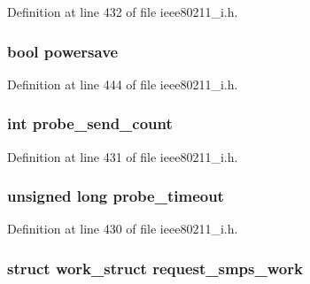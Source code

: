 Definition at line 432 of file ieee80211\-\_\-i.\-h.

\hypertarget{structieee80211__if__managed_afbc3e052896051a278a5ad17f6a6e2bb}{
\subsubsection[{powersave}]{\setlength{\rightskip}{0pt plus 5cm}bool powersave}}\label{structieee80211__if__managed_afbc3e052896051a278a5ad17f6a6e2bb}


Definition at line 444 of file ieee80211\-\_\-i.\-h.

\hypertarget{structieee80211__if__managed_aa9ccec90b375e5c56cc2d521d50e1f3c}{
\subsubsection[{probe\-\_\-send\-\_\-count}]{\setlength{\rightskip}{0pt plus 5cm}int probe\-\_\-send\-\_\-count}}\label{structieee80211__if__managed_aa9ccec90b375e5c56cc2d521d50e1f3c}


Definition at line 431 of file ieee80211\-\_\-i.\-h.

\hypertarget{structieee80211__if__managed_ae94fded3ca4f10915a7d3d29638c47d7}{
\subsubsection[{probe\-\_\-timeout}]{\setlength{\rightskip}{0pt plus 5cm}unsigned long probe\-\_\-timeout}}\label{structieee80211__if__managed_ae94fded3ca4f10915a7d3d29638c47d7}


Definition at line 430 of file ieee80211\-\_\-i.\-h.

\hypertarget{structieee80211__if__managed_a8ca768ab965bec1f9e585a2297f9cb74}{
\subsubsection[{request\-\_\-smps\-\_\-work}]{\setlength{\rightskip}{0pt plus 5cm}struct work\-\_\-struct request\-\_\-smps\-\_\-work}}\label{structieee80211__if__managed_a8ca768ab965bec1f9e585a2297f9cb74}



